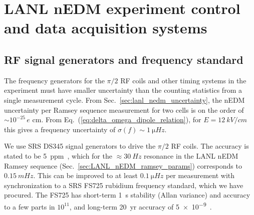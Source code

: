 
\chapter{LANL nEDM experiment control and data acquisition systems}\label{chap:daq}





\section{RF signal generators and frequency standard}\label{sec:pulse_gen_freq_std}


The frequency generators for the $\pi/2$ RF coils and other timing systems in the experiment must have smaller uncertainty than the counting statistics from a single measurement cycle. From Sec.~\ref{sec:lanl_nedm_uncertainty}, the nEDM uncertainty per Ramsey sequence measurement for two cells is on the order of $\sim 10^{-25}\,e\text{ cm}$. From Eq.~(\ref{eq:delta_omega_dipole_relation}), for $E=\qty{12}{kV\per cm}$ this gives a frequency uncertainty of $\sigma(f)\sim \qty{1}{\micro Hz}$.

We use SRS DS345 signal generators to drive the $\pi/2$ RF coils. The accuracy is stated to be \qty{5}{ppm}~\cite{ds345_manual}, which for the $\approx\qty{30}{Hz}$ resonance in the LANL nEDM Ramsey sequence (Sec.~\ref{sec:LANL_nEDM_ramsey_params}) corresponds to $\qty{0.15}{mHz}$. This can be improved to at least $\qty{0.1}{\micro Hz}$ per measurement with synchronization to a SRS FS725 rubidium frequency standard, which we have procured. The FS725 has short-term \qty{1}{s} stability (Allan variance) and accuracy to a few parts in $10^{11}$, and long-term \qty{20}{yr} accuracy of \num{5e-9}~\cite{rubidium_standard_fs725_manual}.

